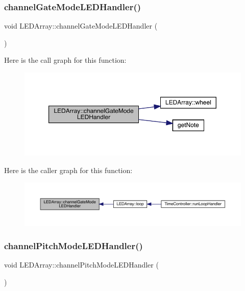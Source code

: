 \subsubsection{\texorpdfstring{channel\+Gate\+Mode\+L\+E\+D\+Handler()}{channelGateModeLEDHandler()}}
{\footnotesize\ttfamily void L\+E\+D\+Array\+::channel\+Gate\+Mode\+L\+E\+D\+Handler (\begin{DoxyParamCaption}{ }\end{DoxyParamCaption})}

Here is the call graph for this function\+:
\nopagebreak
\begin{figure}[H]
\begin{center}
\leavevmode
\includegraphics[width=350pt]{class_l_e_d_array_ab90f5a669b0faf8853070e12b99c4b3d_cgraph}
\end{center}
\end{figure}
Here is the caller graph for this function\+:
\nopagebreak
\begin{figure}[H]
\begin{center}
\leavevmode
\includegraphics[width=350pt]{class_l_e_d_array_ab90f5a669b0faf8853070e12b99c4b3d_icgraph}
\end{center}
\end{figure}
\mbox{\label{class_l_e_d_array_a602c56fdb10d7bf66f8d681081a99b83}} 
\subsubsection{\texorpdfstring{channel\+Pitch\+Mode\+L\+E\+D\+Handler()}{channelPitchModeLEDHandler()}}
{\footnotesize\ttfamily void L\+E\+D\+Array\+::channel\+Pitch\+Mode\+L\+E\+D\+Handler (\begin{DoxyParamCaption}{ }\end{DoxyParamCaption})}

